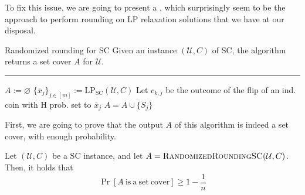 \documentclass[a4paper, 12pt]{report}
\begin{document}
    To fix this issue, we are going to present a , which surprisingly seem to be the  approach to perform rounding on LP relaxation solutions that we have at our disposal.

    \begin{framedalgo}{Randomized rounding for SC}
        Given an instance $(\mathcal U, C)$ of SC, the algorithm returns a set cover $A$ for $\mathcal U$. \\
        \hrule

        \quad
        \begin{algorithmic}[1]
                \State $A := \varnothing$
                \State $\{\overline x_j\}_{j \in [m]} := \mathrm{LP_{SC}}(\mathcal U, C)$ 
                        \State Let $c_{k, j}$ be the outcome of the flip of an ind. coin with H prob. set to $\overline x_j$
                            \State $A = A \cup \{S_j\}$
                        \EndIf
                    \EndFor
                \EndFor
            \EndFunction
        \end{algorithmic}
    \end{framedalgo}

    First, we are going to prove that the output $A$ of this algorithm is indeed a set cover, with enough probability.

    \begin{framedlem}{}
        Let $(\mathcal U, C)$ be a SC instance, and let $A = \textsc{RandomizedRoundingSC}(\mathcal U, C)$. Then, it holds that $$\Pr[A \ \mathrm{is \ a \ set \ cover}] \ge 1 - \dfrac{1}{n}$$
    \end{framedlem}
\end{document}
